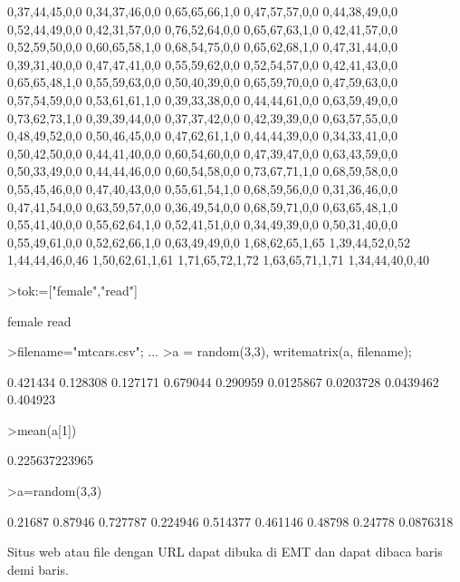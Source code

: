 \documentclass{article}
\begin{document}
\begin{eulernotebook}
\begin{eulercomment}
\begin{eulercomment}
\begin{euleroutput}
  0,37,44,45,0,0
  0,34,37,46,0,0
  0,65,65,66,1,0
  0,47,57,57,0,0
  0,44,38,49,0,0
  0,52,44,49,0,0
  0,42,31,57,0,0
  0,76,52,64,0,0
  0,65,67,63,1,0
  0,42,41,57,0,0
  0,52,59,50,0,0
  0,60,65,58,1,0
  0,68,54,75,0,0
  0,65,62,68,1,0
  0,47,31,44,0,0
  0,39,31,40,0,0
  0,47,47,41,0,0
  0,55,59,62,0,0
  0,52,54,57,0,0
  0,42,41,43,0,0
  0,65,65,48,1,0
  0,55,59,63,0,0
  0,50,40,39,0,0
  0,65,59,70,0,0
  0,47,59,63,0,0
  0,57,54,59,0,0
  0,53,61,61,1,0
  0,39,33,38,0,0
  0,44,44,61,0,0
  0,63,59,49,0,0
  0,73,62,73,1,0
  0,39,39,44,0,0
  0,37,37,42,0,0
  0,42,39,39,0,0
  0,63,57,55,0,0
  0,48,49,52,0,0
  0,50,46,45,0,0
  0,47,62,61,1,0
  0,44,44,39,0,0
  0,34,33,41,0,0
  0,50,42,50,0,0
  0,44,41,40,0,0
  0,60,54,60,0,0
  0,47,39,47,0,0
  0,63,43,59,0,0
  0,50,33,49,0,0
  0,44,44,46,0,0
  0,60,54,58,0,0
  0,73,67,71,1,0
  0,68,59,58,0,0
  0,55,45,46,0,0
  0,47,40,43,0,0
  0,55,61,54,1,0
  0,68,59,56,0,0
  0,31,36,46,0,0
  0,47,41,54,0,0
  0,63,59,57,0,0
  0,36,49,54,0,0
  0,68,59,71,0,0
  0,63,65,48,1,0
  0,55,41,40,0,0
  0,55,62,64,1,0
  0,52,41,51,0,0
  0,34,49,39,0,0
  0,50,31,40,0,0
  0,55,49,61,0,0
  0,52,62,66,1,0
  0,63,49,49,0,0
  1,68,62,65,1,65
  1,39,44,52,0,52
  1,44,44,46,0,46
  1,50,62,61,1,61
  1,71,65,72,1,72
  1,63,65,71,1,71
  1,34,44,40,0,40
\end{euleroutput}
\begin{eulerprompt}
>tok:=["female","read"]
\end{eulerprompt}
\begin{euleroutput}
  female
  read
\end{euleroutput}
\begin{eulerprompt}
>filename="mtcars.csv"; ...
>a = random(3,3), writematrix(a, filename);
\end{eulerprompt}
\begin{euleroutput}
       0.421434      0.128308      0.127171 
       0.679044      0.290959     0.0125867 
      0.0203728     0.0439462      0.404923 
\end{euleroutput}
\begin{eulerprompt}
>mean(a[1])
\end{eulerprompt}
\begin{euleroutput}
  0.225637223965
\end{euleroutput}
\begin{eulerprompt}
>a=random(3,3)
\end{eulerprompt}
\begin{euleroutput}
        0.21687       0.87946      0.727787 
       0.224946      0.514377      0.461146 
        0.48798       0.24778     0.0876318 
\end{euleroutput}
\begin{eulercomment}
Situs web atau file dengan URL dapat dibuka di EMT dan dapat dibaca
baris demi baris.


\end{eulercomment}
\end{eulercomment}
\end{eulercomment}
\end{eulernotebook}
\end{document}

